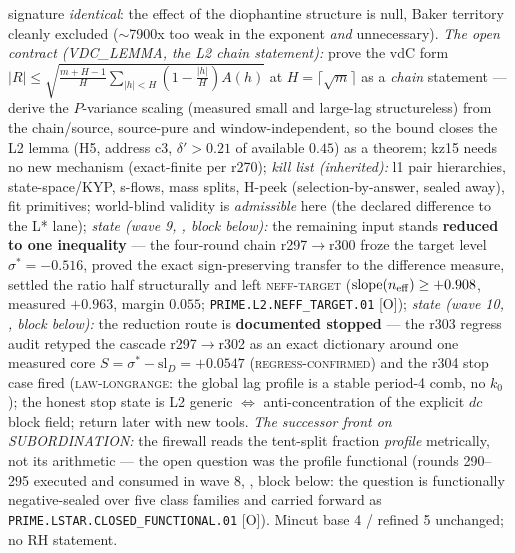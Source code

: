 \documentclass[11pt,a4paper]{article}
\begin{document}
{signature \emph{identical}: the effect of the diophantine
structure is null, Baker territory cleanly excluded ($\sim$7900x
too weak in the exponent \emph{and} unnecessary).  \emph{The open
contract (VDC\_LEMMA, the L2 chain statement):} prove the vdC
form $|R| \le \sqrt{\frac{m+H-1}{H}\sum_{|h|<H}
(1-\frac{|h|}{H})A(h)}$ at $H = \lceil\sqrt{m}\rceil$ as a
\emph{chain} statement --- derive the $P$-variance scaling
(measured small and large-lag structureless) from the
chain/source, source-pure and window-independent, so the bound
closes the L2 lemma (H5, address c3, $\delta' > 0.21$ of
available $0.45$) as a theorem; kz15 needs no new mechanism
(exact-finite per r270); \emph{kill list (inherited):} l1 pair
hierarchies, state-space/KYP, s-flows, mass splits, H-peek
(selection-by-answer, sealed away), fit primitives; world-blind
validity is \emph{admissible} here (the declared difference to
the L* lane); \emph{state (wave 9,
, block below):} the
remaining input stands \textbf{reduced to one inequality} ---
the four-round chain r297$\to$r300 froze the target level
$\sigma^* = -0.516$, proved the exact sign-preserving transfer
to the difference measure, settled the ratio half structurally
and left \textsc{neff-target} ($\mathrm{slope}(n_{\rm eff}) \ge
+0.908$, measured $+0.963$, margin $0.055$;
\texttt{PRIME.L2.\allowbreak NEFF\_TARGET.01} [O]); \emph{state
(wave 10, , block below):}
the reduction route is \textbf{documented stopped} --- the r303
regress audit retyped the cascade r297$\to$r302 as an exact
dictionary around one measured core $S = \sigma^* -
\mathrm{sl}_D = +0.0547$ (\textsc{regress-confirmed}) and the
r304 stop case fired (\textsc{law-longrange}: the global lag
profile is a stable period-4 comb, no $k_0$); the honest stop
state is L2 generic $\Leftrightarrow$ anti-concentration of the
explicit $dc$ block field; return later with new tools.  \emph{The successor front on SUBORDINATION:} the
firewall reads the tent-split fraction \emph{profile} metrically,
not its arithmetic --- the open question was the profile
functional (rounds 290--295 executed and consumed in wave 8,
, block below: the question is
functionally negative-sealed over five class families and carried
forward as \texttt{PRIME.LSTAR.\allowbreak CLOSED\_FUNCTIONAL.01}
[O]).  Mincut base 4 /
refined 5 unchanged; no RH statement.\par}
\end{document}
